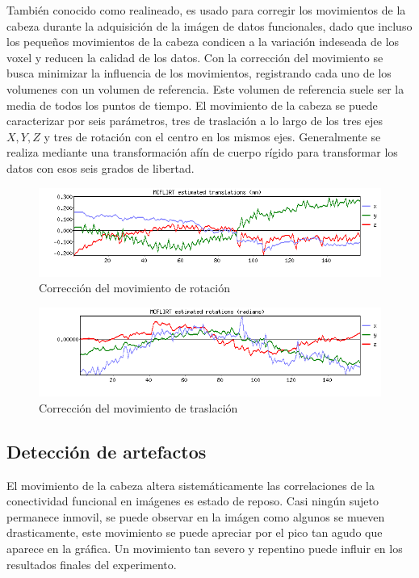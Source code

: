 También conocido como realineado, es usado para corregir los movimientos de la cabeza durante la adquisición de la imágen de datos funcionales, dado que incluso los pequeños movimientos de la cabeza condicen a la variación indeseada de los voxel y reducen la calidad de los datos. Con la corrección del movimiento se busca minimizar la influencia de los movimientos, registrando cada uno de los volumenes con un volumen de referencia. Este volumen de referencia suele ser la media de todos los puntos de tiempo.
El movimiento de la cabeza se puede caracterizar por seis parámetros, tres de traslación a lo largo de los tres ejes $X, Y, Z$ y tres de rotación con el centro en los mismos ejes.
Generalmente se realiza mediante una transformación afín de cuerpo rígido para transformar los datos con esos seis grados de libertad.

\begin{figure}[H]
  \centering
    \includegraphics[scale=0.5]{img/tras.png}
  \caption{Corrección del movimiento de rotación}         \label{preproc:tras}
\end{figure}

\begin{figure}[H]
  \centering
    \includegraphics[scale=0.5]{img/rot.png}
  \caption{Corrección del movimiento de traslación}         \label{preproc:rot}
\end{figure}

\subsection{Detección de artefactos}

El movimiento de la cabeza altera sistemáticamente las correlaciones de la conectividad funcional en imágenes es estado de reposo. Casi ningún sujeto permanece inmovil, se puede observar en la imágen como algunos se mueven drasticamente, este movimiento se puede apreciar por el pico tan agudo que aparece en la gráfica. Un movimiento tan severo y repentino puede influir en los resultados finales del experimento. \cite{arts}

